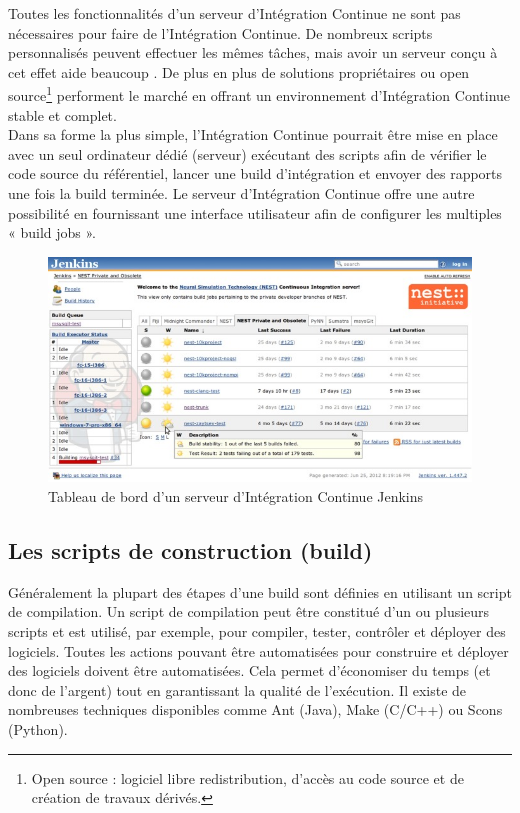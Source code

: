     Toutes les fonctionnalités d’un serveur d’Intégration Continue ne sont pas nécessaires pour faire de l’Intégration Continue. De nombreux scripts personnalisés peuvent effectuer les mêmes tâches, mais avoir un serveur conçu à cet effet aide beaucoup \cite{Duv07}. De plus en plus de solutions propriétaires ou open source\footnote{Open source : logiciel libre redistribution, d'accès au code source et de création de travaux dérivés.} performent le marché en offrant un environnement d’Intégration Continue stable et complet.\\

    Dans sa forme la plus simple, l’Intégration Continue pourrait être mise en place avec un seul ordinateur dédié (serveur) exécutant des scripts afin de vérifier le code source du référentiel, lancer une build d’intégration et envoyer des rapports une fois la build terminée. Le serveur d’Intégration Continue offre une autre possibilité en fournissant une interface utilisateur afin de configurer les multiples « build jobs ».

    \begin{figure}
      \begin{center}
        \includegraphics[scale=0.5]{images/jenkinsBuildJobs.png}
      \end{center}
      \caption{Tableau de bord d'un serveur d'Intégration Continue Jenkins}
      \label{Jenkins build jobs}
    \end{figure}

    \subsection{Les scripts de construction (build)}
    Généralement la plupart des étapes d’une build sont définies en utilisant un script de compilation. Un script de compilation peut être constitué d'un ou plusieurs scripts et est utilisé, par exemple, pour compiler, tester, contrôler et déployer des logiciels. Toutes les actions pouvant être automatisées pour construire et déployer des logiciels doivent être automatisées. Cela permet d'économiser du temps (et donc de l'argent) tout en garantissant la qualité de l'exécution. Il existe de nombreuses techniques disponibles comme Ant (Java), Make (C/C++) ou Scons (Python).\\

